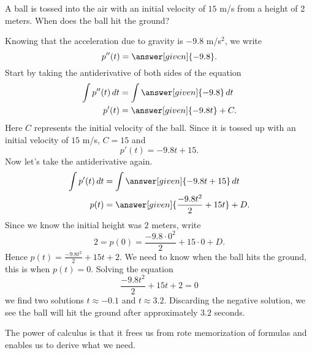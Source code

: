 \documentclass{ximera}
\begin{document}
\begin{example}
A ball is tossed into the air with an initial velocity of $15$ m/s
from a height of 2 meters. When does the ball hit the ground?
\begin{explanation}
Knowing that the acceleration due to gravity is $-9.8$ m/s$^2$, we write
\[
p''(t) = \answer[given]{-9.8}.
\]
Start by taking the antiderivative of both sides of the equation
\begin{align*}
\int p''(t) \d t &= \int \answer[given]{-9.8} \d t\\
p'(t) &= \answer[given]{-9.8 t} + C.
\end{align*}
Here $C$ represents the initial velocity of the ball. Since it is
tossed up with an initial velocity of $15$ m/s, $C = 15$ and 
\[
p'(t) = -9.8t + 15.
\]
Now let's take the antiderivative again. 
\begin{align*}
\int p'(t) \d t &= \int \answer[given]{-9.8t +15} \d t\\
p(t) &= \answer[given]{\frac{-9.8t^2}{2} + 15t} + D.
\end{align*}
Since we know the initial height was $2$ meters, write
\[
2 = p(0) =  \frac{-9.8\cdot 0^2}{2} + 15\cdot 0 + D.
\]
Hence $p(t) = \frac{-9.8t^2}{2} + 15t + 2$. We need to know when the
ball hits the ground, this is when $p(t)=0$. Solving the equation
\[
\frac{-9.8t^2}{2} + 15t + 2 = 0
\]
we find two solutions $t\approx -0.1$ and $t\approx 3.2$. Discarding
the negative solution, we see the ball will hit the ground after
approximately $3.2$ seconds.
\end{explanation}
\end{example}

The power of calculus is that it frees us from rote memorization of
formulas and enables us to derive what we need.
\end{document}

